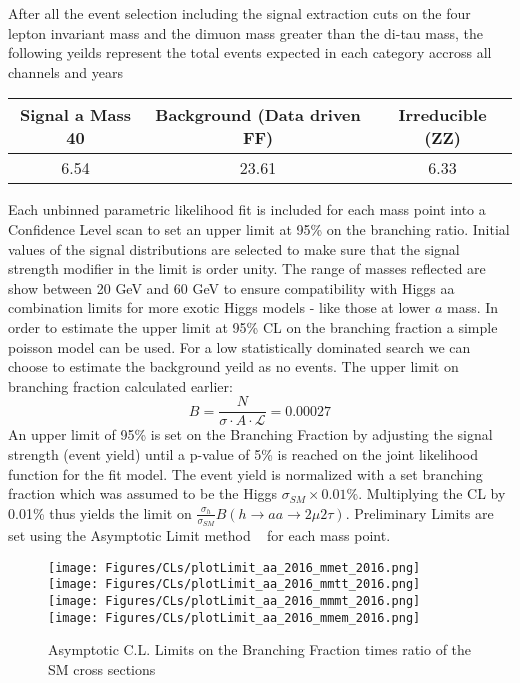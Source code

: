 
After all the event selection including the signal extraction cuts on the four lepton invariant mass and the dimuon mass greater than the di-tau mass, the following yeilds represent the total events expected in each category accross all channels and years 
\begin{table}[h!tbp]
\centering
{}
\begin{tabular*}{0.8\textwidth}{c|c|c}
\hline Signal a Mass 40 & Background (Data driven FF) & Irreducible (ZZ)\\\hline
6.54   & 23.61 & 6.33 \\\hline
\end{tabular*}
\end{table}
 



Each unbinned parametric likelihood fit is included for each mass point into a Confidence Level scan to set an upper limit at 95\% on the branching ratio. Initial values of the signal distributions are selected to make sure that the signal strength modifier in the limit is order unity. The range of masses reflected are show between 20 GeV and 60 GeV to ensure compatibility with Higgs aa combination limits for more exotic Higgs models - like those at lower $a$ mass. 
In order to estimate the upper limit at 95\% CL on the branching fraction a simple poisson model can be used. For a low statistically dominated search we can choose to estimate the background yeild as no events. The upper limit on branching fraction calculated earlier: 
\[B =  \frac{N}{\sigma \cdot A\cdot \mathcal{L}} = 0.00027\] 
An upper limit of 95\% is set on the Branching Fraction by adjusting the signal strength (event yield) until a p-value of 5\% is reached on the joint likelihood function for the fit model. 
The event yield is normalized with a set branching fraction which was assumed to be the Higgs $\sigma_{SM} \times 0.01\%$.
Multiplying the CL by 0.01\% thus yields the limit on $\frac{\sigma_h}{\sigma_{SM}} B(h\rightarrow aa\rightarrow2\mu2\tau)$.
Preliminary Limits are set using the Asymptotic Limit method ~\cite{Cowan_2011} for each mass point.


\begin{figure}[ht!b]
  \centering
  \texttt{[image: Figures/CLs/plotLimit\_aa\_2016\_mmet\_2016.png]}
  \texttt{[image: Figures/CLs/plotLimit\_aa\_2016\_mmtt\_2016.png]}\\
  \texttt{[image: Figures/CLs/plotLimit\_aa\_2016\_mmmt\_2016.png]}
  \texttt{[image: Figures/CLs/plotLimit\_aa\_2016\_mmem\_2016.png]}\\
    \caption{\label{fig:CLs2016} Asymptotic C.L. Limits on the Branching Fraction times ratio of the SM cross sections}
\end{figure}

